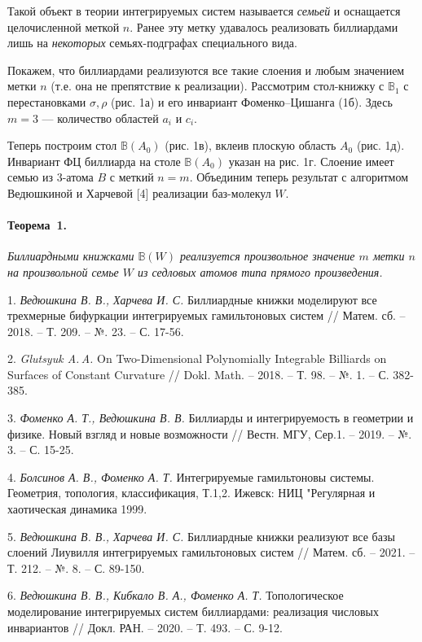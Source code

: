 Такой объект в теории интегрируемых систем называется \textit{семьей} и оснащается целочисленной меткой $n$. Ранее эту метку удавалось реализовать биллиардами лишь на \textit{некоторых} семьях-подграфах специального вида. %
 
Покажем, что биллиардами реализуются все такие слоения и любым значением метки $n$ (т.е. она не препятствие к реализации). Рассмотрим стол-книжку с  $\mathbb{B}_1$ с перестановками $\sigma, \rho$ (рис. 1а) и его инвариант Фоменко--Цишанга (1б). Здесь $m = 3$ --- количество областей $a_i$ и $c_i$. 

Теперь построим стол $\mathbb{B}(A_0)$ (рис. 1в), вклеив плоскую область $A_0$ (рис. 1д). Инвариант ФЦ биллиарда на столе $\mathbb{B}(A_0)$ указан на рис. 1г. Слоение имеет семью из 3-атома $B$ с меткий $n = m$. Объединим теперь результат с алгоритмом Ведюшкиной и Харчевой [4]  реализации баз-молекул $W$.

\paragraph{Теорема~1.}
{\it
	Биллиардными книжками $\mathbb{B}(W)$ реализуется произвольное значение $m$ метки $n$ на произвольной семье $W$ из седловых атомов типа прямого произведения. 
}


\begin{figure}[h]
			\label{elementarybilliards}
		\end{figure}


\litlist

1. {\it Ведюшкина В. В., Харчева И. С.}
Биллиардные книжки моделируют все трехмерные бифуркации интегрируемых гамильтоновых систем // Матем. сб. – 2018. – Т. 209. – №. 23. – С. 17-56.

2. {\it Glutsyuk A.\,A.} On Two-Dimensional Polynomially Integrable Billiards
on Surfaces of Constant Curvature // Dokl. Math. – 2018. – Т. 98. – №. 1. – С. 382-385.

3. {\it Фоменко А. Т., Ведюшкина В. В.} Биллиарды и интегрируемость в геометрии и физике. Новый взгляд и новые возможности // Вестн. МГУ, Сер.1. – 2019. – №. 3. – С. 15-25.

4. {\it Болсинов А. В., Фоменко А. Т.}
Интегрируемые гамильтоновы системы. Геометрия, топология, классификация, Т.1,2.
Ижевск: НИЦ "Регулярная и хаотическая динамика 1999.

5. {\it Ведюшкина В. В., Харчева И. С.}
Биллиардные книжки реализуют все базы слоений Лиувилля интегрируемых гамильтоновых систем // Матем. сб. – 2021. – Т. 212. – №. 8. – С. 89-150.

6. {\it Ведюшкина В. В.,  Кибкало В. А., Фоменко А. Т.} Топологическое моделирование интегрируемых систем биллиардами: реализация числовых инвариантов // Докл. РАН. – 2020. – Т. 493. – С. 9-12.
